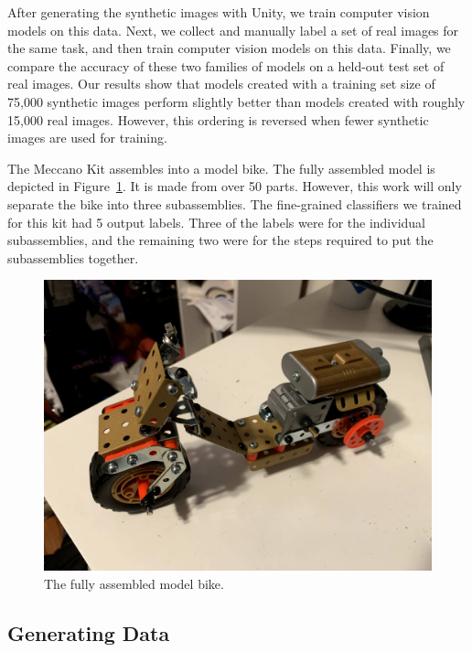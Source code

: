 After generating the synthetic images with Unity, we train
computer vision models on this data.  Next, we  collect and manually
label a set of real images for the same task, and then train computer
vision models on this data.  Finally, we compare the accuracy of these
two families of models on a held-out test set of real images.  Our
results show that models created with a training set size of 75,000
synthetic images perform slightly better than models created with
roughly 15,000 real images.
However, this ordering is reversed when fewer synthetic images are used for
training.

The Meccano Kit assembles into a model bike.
The fully assembled model is depicted in Figure~\ref{fig:full_bike}.
It is made from over 50 parts.
However, this work will only separate the bike into three subassemblies.
The fine-grained classifiers we trained for this kit had 5 output labels.
Three of the labels were for the individual subassemblies, and the remaining two
were for the steps required to put the subassemblies together.

\begin{figure}
  \includegraphics[width=\columnwidth]{figures/synthetic/full_bike.jpg}
  \caption{
    The fully assembled model bike.
  }\label{fig:full_bike}
\end{figure}

\subsection{Generating Data}

